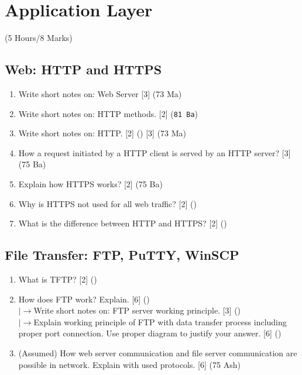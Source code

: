 \documentclass[12pt]{article}
\newcommand{\lb}{\\$\left|\rightarrow\right.$}
\begin{document}
	\pagebreak

\section{Application Layer}
	\begin{center}(5 Hours/8 Marks)\end{center}
	\subsection{Web: HTTP and HTTPS}
		\begin{enumerate}[noitemsep, topsep=0pt]
			\item Write short notes on: Web Server \hfill [3] (73 Ma)

			\item Write short notes on: HTTP methods. \hfill [2] (\texttt{81 Ba})

			\item Write short notes on: HTTP. \hfill [2] () [3] (73 Ma)

			\item How a request initiated by a HTTP client is served by an HTTP server? \hfill [3](75 Ba)

			\item Explain how HTTPS works? \hfill [2] (75 Ba)

			\item Why is HTTPS not used for all web traffic? \hfill [2] ()
			
			\item What is the difference between HTTP and HTTPS? \hfill [2] ()
		\end{enumerate}

	\subsection{File Transfer: FTP, PuTTY, WinSCP}
		\begin{enumerate}[noitemsep, topsep=0pt]
			\item What is TFTP? \hfill [2] ()
			
			\item How does FTP work? Explain. \hfill [6] ()
			\lb Write short notes on: FTP server working principle. \hfill [3] ()
			\lb Explain working principle of FTP with data transfer process including proper port connection. Use proper diagram to justify your answer. \hfill [6] ()

			\item (Assumed) How web server communication and file server communication are possible in network. Explain with used protocols. \hfill [6] (75 Ash)
		\end{enumerate}
\end{document}
